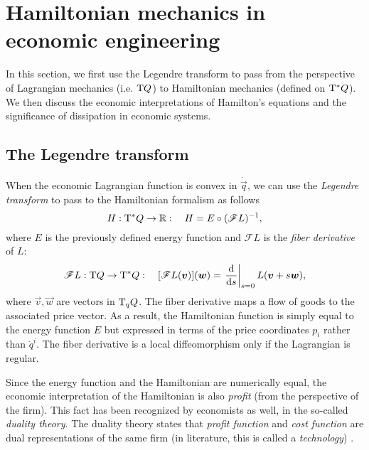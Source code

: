 \section{Hamiltonian mechanics in economic engineering}
In this section, we first use the Legendre transform to pass from the perspective of Lagrangian mechanics (i.e. $\mathrm{T}Q$) to Hamiltonian mechanics (defined on $\mathrm{T}^*Q$). We then discuss the economic interpretations of Hamilton's equations and the significance of dissipation in economic systems.

\label{sec:hamiltonian_ee}
\subsection{The Legendre transform} 
When the economic Lagrangian function is convex in \(\dot{\vec{q}}\), we can use the \emph{Legendre transform} to pass to the Hamiltonian formalism as follows \cite{Abraham1978}
\begin{equation}
    H: \mathrm{T}^*Q \to \mathbb{R}: \quad H = E \circ (\mathscr{F}L)^{-1},
\end{equation}
where \(E\) is the previously defined energy function and \(\mathscr{F}L\) is the \emph{fiber derivative} of \(L\): \cite{Marsden1998}
\begin{equation}
    \mathscr{F}L: \tbundle{Q} \to \ctbundle{Q}: \quad [\mathscr{F}L(\vec{v})](\vec{w}) = \left .\dv{}{s}\right|_{s = 0} L(\vec{v} + s\vec{w}),
\end{equation}
where \(\vec{v}, \vec{w}\) are vectors in \(\mathrm{T}_{q} Q\). The fiber derivative maps a flow of goods to the associated price vector. As a result, the Hamiltonian function is simply equal to the energy function \(E\) but expressed in terms of the price coordinates \(p_i\) rather than \(\dot{q}^i\). The fiber derivative is a local diffeomorphism only if the Lagrangian is regular.

Since the energy function and the Hamiltonian are numerically equal, the economic interpretation of the Hamiltonian is also \emph{profit} (from the perspective of the firm). This fact has been recognized by economists as well, in the so-called \emph{duality theory}. The duality theory states that \emph{profit function} and \emph{cost function} are dual representations of the same firm (in literature, this is called a \emph{technology}) \cite{blume2020,varianhalr1992}.

